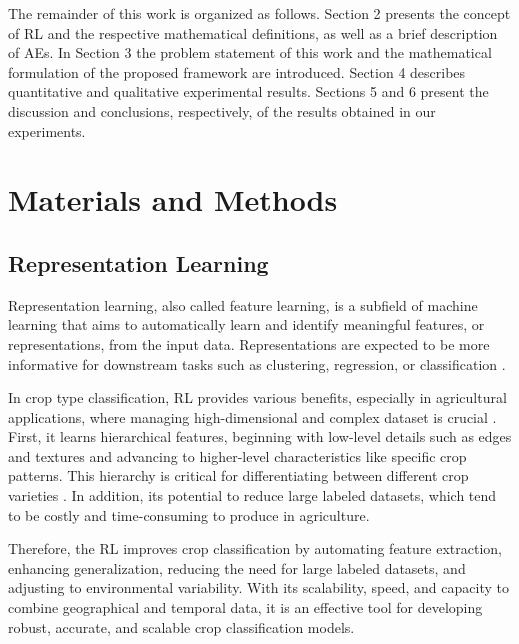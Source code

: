 \documentclass[journal,article,submit,pdftex,moreauthors]{Definitions/mdpi}
\begin{document}
The remainder of this work is organized as follows. Section 2 presents the concept of RL and the respective mathematical definitions, as well as a brief description of AEs. 
In Section 3 the problem statement of this work and the mathematical formulation of the proposed framework are introduced. 
Section 4 describes quantitative and qualitative experimental results. 
Sections 5 and 6 present the discussion and conclusions, respectively, of the results obtained in our experiments.

\section{Materials and Methods}
\subsection{Representation Learning}
Representation learning, also called feature learning, is a subfield of machine learning
that aims to automatically learn and identify meaningful features, or representations, from the input data. Representations are expected to be more informative for downstream tasks such as clustering, regression, or classification \cite{Tzelepi2022}.

In crop type classification, \ac{RL} provides various benefits, especially in agricultural applications, where managing high-dimensional and complex dataset is crucial \cite{Reichstein2019}. First, it learns hierarchical features, beginning with low-level details such as edges and textures and advancing to higher-level characteristics like specific crop patterns. This hierarchy is critical for differentiating between different crop varieties \cite{Kussul2017}. In addition, its potential to reduce large labeled datasets, which tend to be costly and time-consuming to produce in agriculture.

Therefore, the \ac{RL} improves crop classification by automating feature extraction, enhancing generalization, reducing the need for large labeled datasets, and adjusting to environmental variability. With its scalability, speed, and capacity to combine geographical and temporal data, it is an effective tool for developing robust, accurate, and scalable crop classification models.
\end{document}
